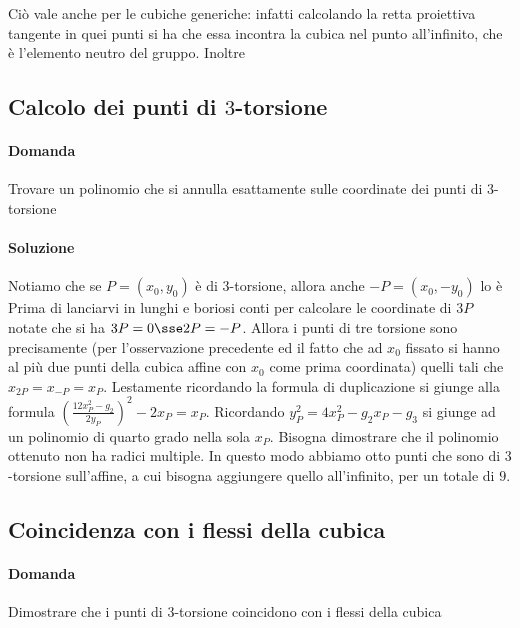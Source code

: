 Ciò vale anche per le cubiche generiche: infatti calcolando la retta proiettiva tangente in quei punti si ha che essa incontra la cubica nel punto all'infinito, che è l'elemento neutro del gruppo.
Inoltre 

\subsection{Calcolo dei punti di $3$-torsione}
\paragraph{Domanda} Trovare un polinomio che si annulla esattamente sulle coordinate dei punti di $3$-torsione

\paragraph{Soluzione}
 Notiamo che se $P = (x_0, y_0)$ è di $3$-torsione, allora anche $-P = (x_0, -y_0)$ lo è
 Prima di lanciarvi in lunghi e boriosi conti per calcolare le coordinate di $3P$ notate che si ha $3P = 0 \sse 2P = -P$. Allora i punti di tre torsione sono precisamente (per l'osservazione precedente ed il fatto che ad $x_0$ fissato si hanno al più due punti della cubica affine con $x_0$ come prima coordinata) quelli tali che $x_{2P} = x_{-P} = x_{P}$. Lestamente ricordando la formula di duplicazione si giunge alla formula $\left( \frac{12 x_P^2 - g_2}{2 y_P} \right)^2 - 2 x_P = x_P$. Ricordando $y_P^2 = 4 x_P^2 - g_2 x_P - g_3$ si giunge ad un polinomio di quarto grado nella sola $x_P$.
 Bisogna dimostrare che il polinomio ottenuto non ha radici multiple. In questo modo abbiamo otto punti che sono di $3$-torsione sull'affine, a cui bisogna aggiungere quello all'infinito, per un totale di $9$.

\subsection{Coincidenza con i flessi della cubica}
\paragraph{Domanda} Dimostrare che i punti di $3$-torsione coincidono con i flessi della cubica

